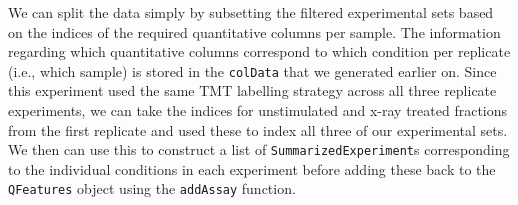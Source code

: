 \documentclass[9pt,a4paper,]{extarticle}
\newenvironment{Shaded}{\begin{snugshade}}{\end{snugshade}}
\newcommand{\AttributeTok}[1]{\textcolor[rgb]{0.13,0.29,0.53}{#1}}
\newcommand{\DocumentationTok}[1]{\textcolor[rgb]{0.56,0.35,0.01}{\textbf{\textit{#1}}}}
\newcommand{\FunctionTok}[1]{\textcolor[rgb]{0.13,0.29,0.53}{\textbf{#1}}}
\newcommand{\NormalTok}[1]{#1}
\newcommand{\OtherTok}[1]{\textcolor[rgb]{0.56,0.35,0.01}{#1}}
\newcommand{\SpecialCharTok}[1]{\textcolor[rgb]{0.81,0.36,0.00}{\textbf{#1}}}
\newcommand{\StringTok}[1]{\textcolor[rgb]{0.31,0.60,0.02}{#1}}
\begin{document}
We can split the data simply by subsetting the filtered experimental sets based
on the indices of the required quantitative columns per sample. The information
regarding which quantitative columns correspond to which condition per replicate
(i.e., which sample) is stored in the \texttt{colData} that we generated earlier on.
Since this experiment used the same TMT labelling strategy across all three
replicate experiments, we can take the indices for unstimulated and x-ray
treated fractions from the first replicate and used these to index all three of
our experimental sets. We then can use this to construct a list of
\texttt{SummarizedExperiment}s corresponding to the individual conditions in each
experiment before adding these back to the \texttt{QFeatures} object using the
\texttt{addAssay} function.

\begin{Shaded}
\end{Shaded}
\end{document}
